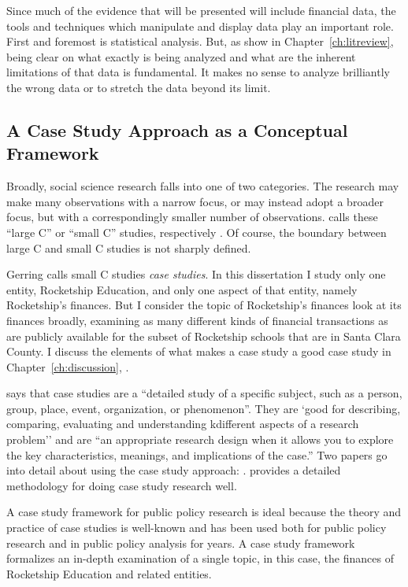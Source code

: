 Since much of the evidence that will be presented will include financial data, the tools and techniques which manipulate and display data play an important role. First and foremost is statistical analysis. But, as \textcite{Epple.etal2016} show in Chapter~\ref{ch:litreview}, being clear on what exactly is being analyzed and what are the inherent limitations of that data is fundamental. It makes no sense to analyze brilliantly the wrong data or to stretch the data beyond its limit. 

\subsection{A Case Study Approach as a Conceptual Framework}\indent

Broadly, social science research falls into one of two categories. The research may make many observations with a narrow focus, or may instead adopt a broader focus, but with a correspondingly smaller number of observations. \citeauthor{Gerring2017} calls these ``large C'' or ``small C'' studies, respectively \parencite[xvii]{Gerring2017}. Of course, the boundary between large C and small C studies is not sharply defined.

Gerring calls small C studies \textit{case studies}. In this dissertation I study only one entity, Rocketship Education, and only one aspect of that entity, namely Rocketship's finances. But I consider the topic of  Rocketship's finances look at its finances broadly, examining as many different kinds of financial transactions as are publicly available for the subset of Rocketship schools that are in Santa Clara County. I discuss the elements of what makes a case study a good case study in Chapter~\ref{ch:discussion}, \textit{{}}.

\textcite{McCombes2019} says that case studies are a ``detailed study of a specific subject, such as a person, group, place, event, organization, or phenomenon''. They are `good for describing, comparing, evaluating and understanding kdifferent aspects of a research problem'' and are ``an appropriate research design when it allows you to explore the key characteristics, meanings, and implications of the case.'' Two papers go into detail about using the case study approach: \textcite{Crowe.etal2011,Rashid.etal2019}. \textcite{Yin2018} provides a detailed methodology for doing case study research well.

A case study framework for public policy research is ideal because the theory and practice of case studies is well-known and has been used both for public policy research and in  public policy analysis for years. A case study framework formalizes an in-depth examination of a single topic, in this case, the finances of Rocketship Education and related entities.

